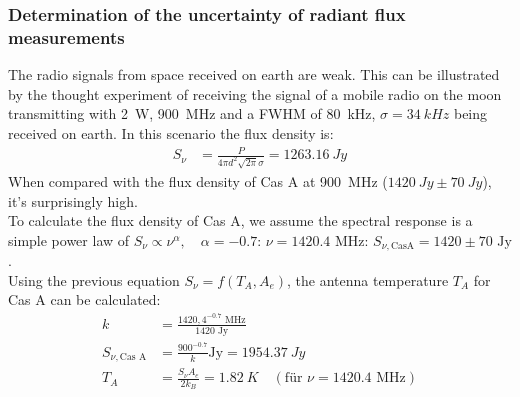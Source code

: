 \documentclass[10pt,a4paper, bibliography=totoc]{scrartcl}
\begin{document}
\subsubsection{Determination of the uncertainty of radiant flux measurements}
The radio signals from space received on earth are weak. This can be illustrated by the thought experiment of receiving the signal of a mobile radio on the moon transmitting with \qty{2}{W}, \qty{900}{MHz} and a FWHM of \qty{80}{kHz}, $\sigma=\qty{34}{kHz}$ being received on earth. In this scenario the flux density is:
\begin{align}
	S_{\nu} &= \frac{P}{4\pi d^2\sqrt{2\pi}\sigma} = \qty{1263.16}{Jy}
\end{align}
When compared with the flux density of Cas A at \qty{900}{MHz} ($\qty{1420}{Jy}\pm\qty{70}{Jy}$), it's surprisingly high.\\
To calculate the flux density of Cas A, we assume the spectral response is a simple power law of $S_{\nu} \propto \nu^{\alpha}, \quad \alpha = -0.7$:
$\nu = 1420.4\text{ MHz}$: $S_{\nu,\text{CasA}} = 1420 \pm 70 \text{ Jy}$.\\
Using the previous equation $S_\nu=f(T_A,A_e)$, the antenna temperature $T_A$ for Cas A can be calculated:
\begin{align}
k &= \frac{1420,4^{-0.7}\text{ MHz}}{1420\text{ Jy}} \\
S_{\nu,\text{Cas A}} &= \frac{900^{-0.7}}{k} \text{Jy} = \qty{1954.37}{Jy} \\
T_{A} &= \frac{S_{\nu}A_{e}}{2k_{B}} = \qty{1.82}{K} \quad (\text{für } \nu = 1420.4\text{ MHz}) \label{eq: antenna temp}
\end{align}
\end{document}
